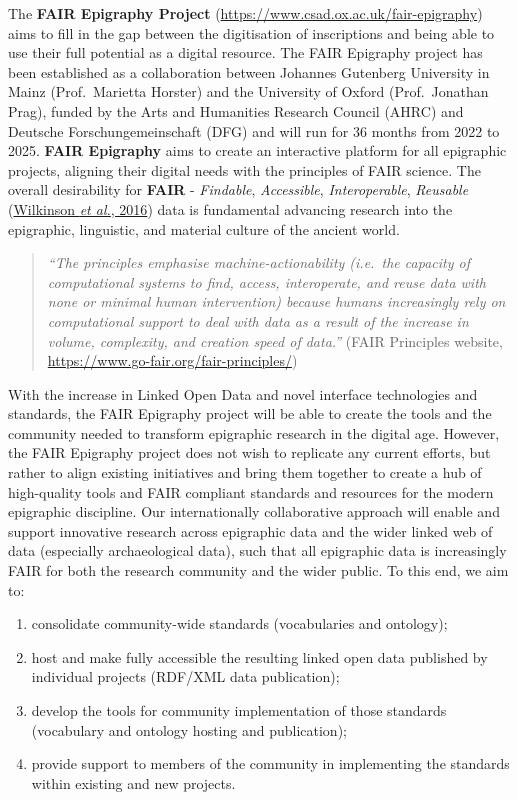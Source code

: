 \documentclass[
  12pt,
]{scrreprt}
\providecommand{\tightlist}{%
  \setlength{\itemsep}{0pt}\setlength{\parskip}{0pt}}
\begin{document}
The \textbf{FAIR Epigraphy Project}
(\url{https://www.csad.ox.ac.uk/fair-epigraphy}) aims to fill in the gap
between the digitisation of inscriptions and being able to use their
full potential as a digital resource. The FAIR Epigraphy project has
been established as a collaboration between Johannes Gutenberg
University in Mainz (Prof.~Marietta Horster) and the University of
Oxford (Prof.~Jonathan Prag), funded by the Arts and Humanities Research
Council (AHRC) and Deutsche Forschungemeinschaft (DFG) and will run for
36 months from 2022 to 2025. \textbf{FAIR Epigraphy} aims to create an
interactive platform for all epigraphic projects, aligning their digital
needs with the principles of FAIR science. The overall desirability for
\textbf{FAIR} - \emph{Findable}, \emph{Accessible},
\emph{Interoperable}, \emph{Reusable}
(\protect\hyperlink{ref-wilkinson_fair_2016}{Wilkinson \emph{et al.},
2016}) data is fundamental advancing research into the epigraphic,
linguistic, and material culture of the ancient world.

\begin{quote}
\emph{``The principles emphasise machine-actionability (i.e.~the
capacity of computational systems to find, access, interoperate, and
reuse data with none or minimal human intervention) because humans
increasingly rely on computational support to deal with data as a result
of the increase in volume, complexity, and creation speed of data.''}
(FAIR Principles website,
\url{https://www.go-fair.org/fair-principles/})
\end{quote}

With the increase in Linked Open Data and novel interface technologies
and standards, the FAIR Epigraphy project will be able to create the
tools and the community needed to transform epigraphic research in the
digital age. However, the FAIR Epigraphy project does not wish to
replicate any current efforts, but rather to align existing initiatives
and bring them together to create a hub of high-quality tools and FAIR
compliant standards and resources for the modern epigraphic discipline.
Our internationally collaborative approach will enable and support
innovative research across epigraphic data and the wider linked web of
data (especially archaeological data), such that all epigraphic data is
increasingly FAIR for both the research community and the wider public.
To this end, we aim to:

\begin{enumerate}
\def\labelenumi{\arabic{enumi}.}
\tightlist
\item
  consolidate community-wide standards (vocabularies and ontology);
\item
  host and make fully accessible the resulting linked open data
  published by individual projects (RDF/XML data publication);
\item
  develop the tools for community implementation of those standards
  (vocabulary and ontology hosting and publication);
\item
  provide support to members of the community in implementing the
  standards within existing and new projects.
\end{enumerate}
\end{document}
